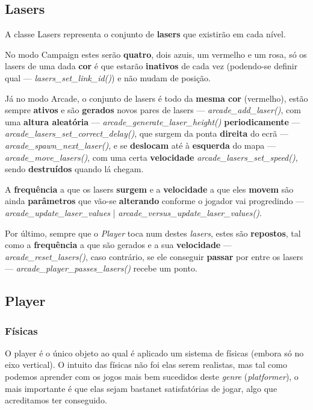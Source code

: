 \documentclass{report}
\begin{document}
\subsection{Lasers}

A classe Lasers representa o conjunto de \textbf{lasers} que existirão em cada nível. 

No modo Campaign estes serão \textbf{quatro}, dois azuis, um vermelho e um rosa, só os lasers de uma dada \textbf{cor} é que estarão \textbf{inativos} de cada vez (podendo-se definir qual --- \textit{lasers\_set\_link\_id()}) e não mudam de posição.

Já no modo Arcade, o conjunto de lasers é todo da \textbf{mesma cor} (vermelho), estão sempre \textbf{ativos} e são \textbf{gerados} novos pares de lasers --- \textit{arcade\_add\_laser()}, com uma \textbf{altura aleatória} --- \textit{arcade\_generate\_laser\_height()} \textbf{periodicamente} --- \textit{arcade\_lasers\_set\_correct\_delay()}, que surgem da ponta \textbf{direita} do ecrã --- \textit{arcade\_spawn\_next\_laser()}, e se \textbf{deslocam} até à \textbf{esquerda} do mapa --- \textit{arcade\_move\_lasers()}, com uma certa \textbf{velocidade} \textit{arcade\_lasers\_set\_speed()}, sendo \textbf{destruídos} quando lá chegam.

A \textbf{frequência} a que os lasers \textbf{surgem} e a \textbf{velocidade} a que eles \textbf{movem} são ainda \textbf{parâmetros} que vão-se \textbf{alterando} conforme o jogador vai progredindo --- \textit{arcade\_update\_laser\_values} | \textit{arcade\_versus\_update\_laser\_values()}.

Por último, sempre que o \textit{Player} toca num destes \textit{lasers}, estes são \textbf{repostos}, tal como a \textbf{frequência} a que são gerados e a sua \textbf{velocidade} --- \textit{arcade\_reset\_lasers()}, caso contrário, se ele conseguir \textbf{passar} por entre os lasers --- \textit{arcade\_player\_passes\_lasers()} recebe um ponto.

\subsection{Player}

\subsubsection{Físicas}

O player é o único objeto ao qual é aplicado um sistema de físicas (embora só no eixo vertical). O intuito das físicas não foi elas serem realistas, mas tal como podemos aprender com os jogos mais bem sucedidos deste \textit{genre} (\textit{platformer}), o mais importante é que elas sejam bastanet satisfatórias de jogar, algo que acreditamos ter conseguido.
\end{document}
